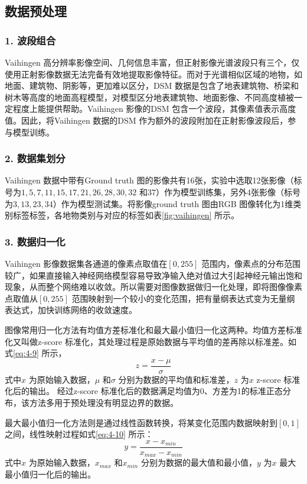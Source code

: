 \subsection{数据预处理}
\label{sec:second-2}

\subsubsection*{1. 波段组合}
Vaihingen 高分辨率影像空间、几何信息丰富，但正射影像光谱波段只有三个，仅使用正射影像数据无法完备有效地提取影像特征。而对于光谱相似区域的地物，如地面、建筑物、阴影等，更加难以区分，DSM 数据是包含了地表建筑物、桥梁和树木等高度的地面高程模型，对模型区分地表建筑物、地面影像、不同高度植被一定程度上能提供帮助。Vaihingen 影像的DSM 包含一个波段，其像素值表示高度值。因此，将Vaihingen 数据的DSM 作为额外的波段附加在正射影像波段后，参与模型训练。

\subsubsection*{2. 数据集划分}
Vaihingen 数据中带有Ground truth 图的影像共有16张，实验中选取12张影像（标号为$1,5,7,11,15,17,21,26,28,30,32$ 和$37$）作为模型训练集，另外4张影像（标号为$3,13,23,34$）作为模型测试集。将影像ground truth 图由RGB 图像转化为1维类别标签标签，各地物类别与对应的标签如表\ref{fig:vaihingen} 所示。

\subsubsection*{3. 数据归一化}
Vaihingen 影像数据集各通道的像素点取值在$[0,255]$ 范围内，像素点的分布范围较广，如果直接输入神经网络模型容易导致净输入绝对值过大引起神经元输出饱和现象，从而整个网络难以收敛。所以需要对图像数据做归一化处理，即将图像像素点取值从$[0,255]$ 范围映射到一个较小的变化范围，把有量纲表达式变为无量纲表达式，加快训练网络的收敛速度。

图像常用归一化方法有均值方差标准化和最大最小值归一化这两种。均值方差标准化又叫做z-score 标准化，其处理过程是原始数据与平均值的差再除以标准差。如式\ref{eq:4-9} 所示，
\begin{equation}
  \label{eq:4-9}
  z = \frac{x-\mu}{\sigma}
\end{equation}
式中$x$ 为原始输入数据，$\mu$ 和$\sigma$ 分别为数据的平均值和标准差，$z$ 为$x$ z-score 标准化后的输出。 经过z-score 标准化后的数据满足均值为0、方差为1的标准正态分布，该方法多用于预处理没有明显边界的数据。

最大最小值归一化方法则是通过线性函数转换，将某变化范围内数据映射到$[0,1]$ 之间，线性映射过程如式\ref{eq:4-10} 所示：
\begin{equation}
  \label{eq:4-10}
  y = \frac{x-x_{min}}{x_{max}-x_{min}}
\end{equation}
式中$x$ 为原始输入数据，$x_{max}$ 和$x_{min}$ 分别为数据的最大值和最小值，$y$ 为$x$ 最大最小值归一化后的输出。

